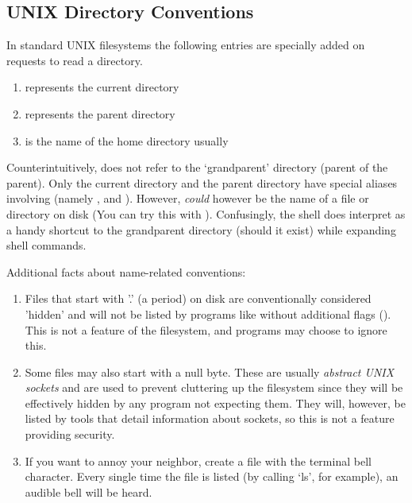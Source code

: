 \subsection{UNIX Directory Conventions}

In standard UNIX filesystems the following entries are specially added on requests to read a directory.

\begin{enumerate}
  \item {} represents the current directory
  \item {} represents the parent directory
  \item \keyword{\textasciitilde} is the name of the home directory usually
\end{enumerate}

Counterintuitively,  does not refer to the `grandparent' directory (parent of the parent).
Only the current directory and the parent directory have special aliases involving  (namely ,  and ).
However,  \emph{could} however be the name of a file or directory on disk (You can try this with ).
Confusingly, the shell  does interpret  as a handy shortcut to the grandparent directory (should it exist) while expanding shell commands.

Additional facts about name-related conventions:

\begin{enumerate}
    \item Files that start with '.' (a period) on disk are conventionally considered 'hidden' and will not be listed by programs like  without additional flags ().
        This is not a feature of the filesystem, and programs may choose to ignore this.
    \item Some files may also start with a null byte.
            These are usually \emph{abstract UNIX sockets} and are used to prevent cluttering up the filesystem since they will be effectively hidden by any program not expecting them.
            They will, however, be listed by tools that detail information about sockets, so this is not a feature providing security.
    \item If you want to annoy your neighbor, create a file with the terminal bell character.
        Every single time the file is listed (by calling `ls', for example), an audible bell will be heard.
\end{enumerate}

